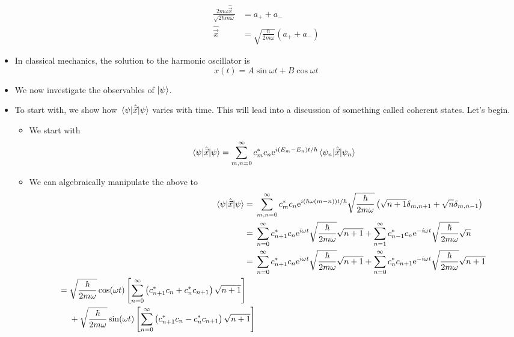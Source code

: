 \documentclass[../notes.tex]{subfiles}
\begin{document}
\begin{itemize}
    \begin{align*}
        \frac{2m\omega\hat{\vec{x}}}{\sqrt{2\hbar m\omega}} &= a_++a_-\\
        \hat{\vec{x}} &= \sqrt{\frac{\hbar}{2m\omega}}(a_++a_-)
    \end{align*}
    \item In classical mechanics, the solution to the harmonic oscillator is
    \begin{equation*}
        x(t) = A\sin\omega t+B\cos\omega t
    \end{equation*}
    \item We now investigate the observables of $\ket{\psi}$.
    \item To start with, we show how $\ev{\hat{\vec{x}}}{\psi}$ varies with time. This will lead into a discussion of something called coherent states. Let's begin.
    \begin{itemize}
        \item We start with
        \begin{equation*}
            \ev{\hat{\vec{x}}}{\psi} = \sum_{m,n=0}^\infty c_m^*c_n\e[i(E_m-E_n)t/\hbar]\mel{\psi_n}{\hat{\vec{x}}}{\psi_n}
        \end{equation*}
        \item We can algebraically manipulate the above to
        \begin{align*}
            \ev{\hat{\vec{x}}}{\psi} ={}& \sum_{m,n=0}^\infty c_m^*c_n\e[i(\hbar\omega(m-n))t/\hbar]\sqrt{\frac{\hbar}{2m\omega}}\left( \sqrt{n+1}\delta_{m,n+1}+\sqrt{n}\delta_{m,n-1} \right)\\
            ={}& \sum_{n=0}^\infty c_{n+1}^*c_n\e[i\omega t]\sqrt{\frac{\hbar}{2m\omega}}\sqrt{n+1}+\sum_{n=1}^\infty c_{n-1}^*c_n\e[-i\omega t]\sqrt{\frac{\hbar}{2m\omega}}\sqrt{n}\\
            ={}& \sum_{n=0}^\infty c_{n+1}^*c_n\e[i\omega t]\sqrt{\frac{\hbar}{2m\omega}}\sqrt{n+1}+\sum_{n=0}^\infty c_n^*c_{n+1}\e[-i\omega t]\sqrt{\frac{\hbar}{2m\omega}}\sqrt{n+1}\\
            \begin{split}
                ={}& \sqrt{\frac{\hbar}{2m\omega}}\cos(\omega t)\left[ \sum_{n=0}^\infty\left( c_{n+1}^*c_n+c_n^*c_{n+1} \right)\sqrt{n+1} \right]\\
                & +\sqrt{\frac{\hbar}{2m\omega}}\sin(\omega t)\left[ \sum_{n=0}^\infty\left( c_{n+1}^*c_n-c_n^*c_{n+1} \right)\sqrt{n+1} \right]
            \end{split}
        \end{align*}

\end{itemize}
\end{itemize}
\end{document}
